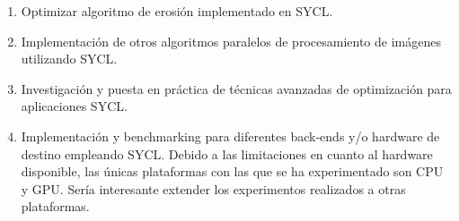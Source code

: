  \begin{enumerate}
     \item Optimizar algoritmo de erosión implementado en SYCL.
     \item Implementación de otros algoritmos paralelos de procesamiento de imágenes utilizando SYCL.
     \item Investigación y puesta en práctica de técnicas avanzadas de optimización para aplicaciones SYCL.
     \item Implementación y benchmarking para diferentes back-ends y/o hardware de destino empleando SYCL. Debido a las limitaciones en cuanto al hardware disponible, las únicas plataformas con las que se ha experimentado son CPU y GPU. Sería interesante extender los experimentos realizados a otras plataformas.
 \end{enumerate}




